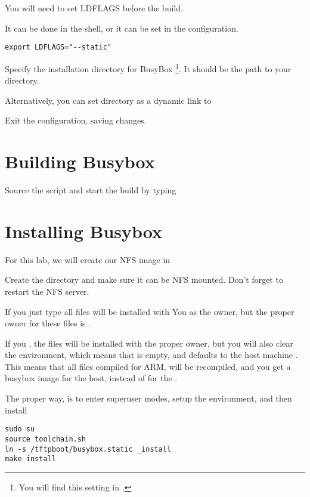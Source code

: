 You will need to set LDFLAGS before the build.

It can be done in the shell, or it can be set in the configuration.

\begin{verbatim}
export LDFLAGS="--static"
\end{verbatim}

Specify the installation directory for BusyBox
\footnote{You will find this setting in
.}.
It should be the path to your  directory.

Alternatively, you can set  directory as a dynamic link
to 

Exit the configuration, saving changes.

\section{Building Busybox}

Source the  script and start the build by typing 

\section{Installing Busybox}

For this lab, we will create our NFS image in 

Create the directory and make sure it can be NFS mounted. Don't forget to restart the NFS server.

If you just type  all files will be installed with You as the owner,
but the proper owner for these files is .

If you , the files will be installed with the proper owner,
but you will also clear the environment, which means that  is empty,
and defaults to the host machine . This means that all files compiled for ARM, 
will be recompiled, and you get a busybox image for the host, instead of for the \devboard.

The proper way, is to enter superuser modes, setup the environment, and then install

\begin{verbatim}
sudo su
source toolchain.sh
ln -s /tftpboot/busybox.static _install
make install
\end{verbatim}

